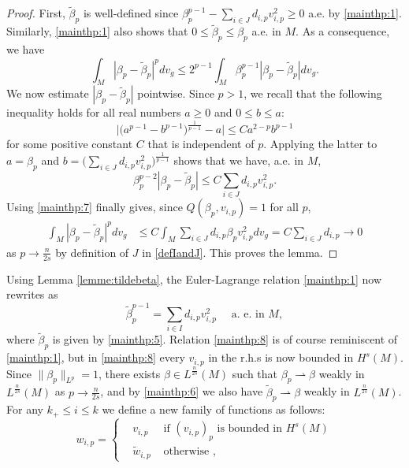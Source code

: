 \documentclass[10pt]{amsart}
\numberwithin{equation}{section}
\theoremstyle{plain}
\theoremstyle{remark}
\begin{document}
\begin{proof}
First, $\tilde{\beta}_p$ is well-defined since $\beta_p^{p-1} - \sum_{i \in J}d_{i,p} v_{i,p}^2 \ge 0$ a.e. by \eqref{mainthp:1}. Similarly, \eqref{mainthp:1} also shows that $0 \le \tilde{\beta}_p \le \beta_p$ a.e. in $M$. As a consequence, we have 
\begin{equation} \label{mainthp:7}
 \int_M |\beta_p - \tilde{\beta}_p|^{p}dv_g \le 2^{p-1} \int_M \beta_p^{p-1} |\beta_p - \tilde{\beta}_p| dv_g. 
\end{equation} 
We now estimate $|\beta_p - \tilde{\beta}_p|$ pointwise. Since $p >1$, we recall that the following inequality holds for all real numbers $a \ge0$ and $0 \le b \le a$:
$$ \Big|\big(a^{p-1} - b^{p-1}\big)^{\frac{1}{p-1}} - a \Big| \le C a^{2-p}b^{p-1} $$
for some positive constant $C$ that is independent of $p$. Applying the latter to $a = \beta_p$ and $b = \big(\sum_{i \in J}d_{i,p} v_{i,p}^2\big)^{\frac{1}{p-1}}$ shows that we have, a.e. in $M$, 
$$\beta_p^{p-2} |\beta_p - \tilde{\beta}_p| \le C \sum_{i \in J}d_{i,p} v_{i,p}^2.$$
Using \eqref{mainthp:7} finally gives, since $Q(\beta_p, v_{i,p}) = 1$ for all $p$,
$$ \begin{aligned}
 \int_M |\beta_p - \tilde{\beta}_p|^{p}dv_g & \le  C\int_M \sum_{i \in J}d_{i,p}\beta_p v_{i,p}^2 dv_g  = C \sum_{i \in J}d_{i,p} \to 0
\end{aligned}$$
as $p \to \frac{n}{2s}$ by definition of $J$ in \eqref{defIandJ}. This proves the lemma.
\end{proof}
Using Lemma \ref{lemme:tildebeta}, the Euler-Lagrange relation \eqref{mainthp:1} now rewrites as 
\begin{equation} \label{mainthp:8}
  \tilde{\beta}_p^{p-1} = \sum_{i\in I} d_{i,p} v_{i,p}^2 \quad \text{ a. e. in } M,
\end{equation}
where $\tilde{\beta}_p$ is given by \eqref{mainthp:5}. Relation \eqref{mainthp:8} is of course reminiscent of \eqref{mainthp:1}, but in \eqref{mainthp:8} every $v_{i,p}$ in the r.h.s is now bounded in $H^s(M)$. Since $\| \beta_p \|_{L^p}=1$, there exists  $\beta \in L^{\frac{n}{2s}}(M)$ such that $\beta_p \rightharpoonup \beta$ weakly in $L^{\frac{n}{2s}}(M)$ as $p \to \frac{n}{2s}$, and by \eqref{mainthp:6} we also have $\tilde{\beta}_p\rightharpoonup \beta$ weakly in $L^{\frac{n}{2s}}(M)$. For any $k_+ \le i \le k$ we define a new family of functions as follows: 
\begin{equation} \label{defwip}
w_{i,p} = \left \{
\begin{aligned}
& v_{i,p} & \text{ if } (v_{i,p})_p \text{ is bounded in } H^s(M) \\ 
& \tilde{w}_{i,p} 
 & \text{ otherwise }, 
\end{aligned}
\right.
\end{equation}
\end{document}
